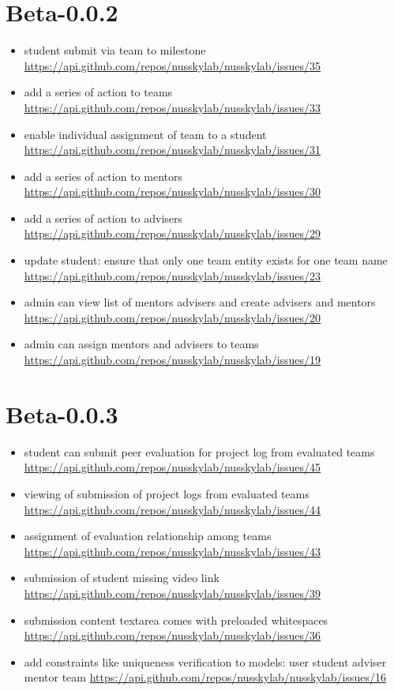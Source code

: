 {\section{Beta-0.0.2}
\begin{itemize}[noitemsep]
    \item student submit via team to milestone \url{https://api.github.com/repos/nusskylab/nusskylab/issues/35} 
    \item add a series of action to teams \url{https://api.github.com/repos/nusskylab/nusskylab/issues/33} 
    \item enable individual assignment of team to a student \url{https://api.github.com/repos/nusskylab/nusskylab/issues/31} 
    \item add a series of action to mentors \url{https://api.github.com/repos/nusskylab/nusskylab/issues/30} 
    \item add a series of action to advisers \url{https://api.github.com/repos/nusskylab/nusskylab/issues/29} 
    \item update student: ensure that only one team entity exists for one team name \url{https://api.github.com/repos/nusskylab/nusskylab/issues/23} 
    \item admin can view list of mentors  advisers  and create advisers and mentors \url{https://api.github.com/repos/nusskylab/nusskylab/issues/20} 
    \item admin can assign mentors and advisers to teams \url{https://api.github.com/repos/nusskylab/nusskylab/issues/19} 
\end{itemize}

\section{Beta-0.0.3}
\begin{itemize}[noitemsep]
    \item student can submit peer evaluation for project log from evaluated teams \url{https://api.github.com/repos/nusskylab/nusskylab/issues/45} 
    \item viewing of submission of project logs from evaluated teams \url{https://api.github.com/repos/nusskylab/nusskylab/issues/44} 
    \item assignment of evaluation relationship among teams \url{https://api.github.com/repos/nusskylab/nusskylab/issues/43} 
    \item submission of student missing video link \url{https://api.github.com/repos/nusskylab/nusskylab/issues/39} 
    \item submission content textarea comes with preloaded whitespaces \url{https://api.github.com/repos/nusskylab/nusskylab/issues/36} 
    \item add constraints like uniqueness  verification to models: user  student  adviser  mentor  team \url{https://api.github.com/repos/nusskylab/nusskylab/issues/16} 
\end{itemize}

}

